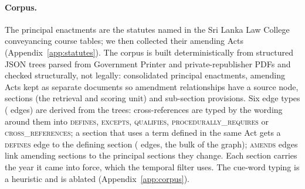 \documentclass{article}
\begin{document}
\paragraph{Corpus.} The principal enactments are the \nPrincipal{} statutes
named in the Sri Lanka Law College conveyancing course tables; we then
collected their amending Acts (Appendix~\ref{app:statutes}). The corpus is
built deterministically from structured JSON trees parsed from Government
Printer and private-republisher PDFs and checked structurally, not legally:
\nPrincipal{} consolidated principal enactments, \nAmending{} amending Acts
kept as separate documents so amendment relationships have a source node,
\nSections{} sections (the retrieval and scoring unit) and \nProvisions{}
sub-section provisions. Six edge types (\nEdges{} edges) are derived from the
trees: cross-references are typed by the wording around them into
\textsc{defines}, \textsc{excepts}, \textsc{qualifies},
\textsc{procedurally\_requires} or \textsc{cross\_references}; a section that
uses a term defined in the same Act gets a \textsc{defines} edge to the
defining section (\nEdgesDefines{} edges, the bulk of the graph);
\textsc{amends} edges link amending sections to the principal sections they
change. Each section carries the year it came into force, which the temporal
filter uses. The cue-word typing is a heuristic and is ablated
(Appendix~\ref{app:corpus}).
\end{document}
